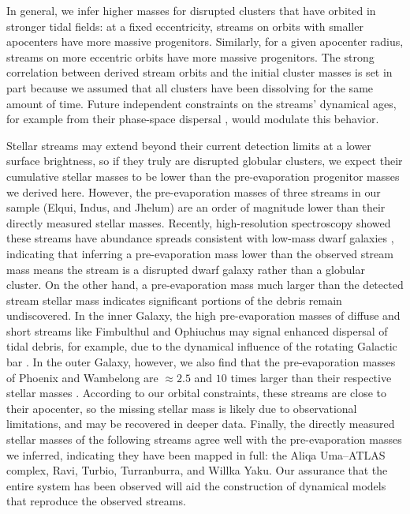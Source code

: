 \documentclass[twocolumn]{aastex63}
\begin{document}
In general, we infer higher masses for disrupted clusters that have orbited in stronger tidal fields: at a fixed eccentricity, streams on orbits with smaller apocenters have more massive progenitors.
Similarly, for a given apocenter radius, streams on more eccentric orbits have more massive progenitors.
The strong correlation between derived stream orbits and the initial cluster masses is set in part because we assumed that all clusters have been dissolving for the same amount of time.
Future independent constraints on the streams' dynamical ages, for example from their phase-space dispersal \citep{buckley:2019},  would modulate this behavior.

Stellar streams may extend beyond their current detection limits at a lower surface brightness, so if they truly are disrupted globular clusters, we expect their cumulative stellar masses to be lower than the pre-evaporation progenitor masses we derived here.
However, the pre-evaporation masses of three streams in our sample (Elqui, Indus, and Jhelum) are an order of magnitude lower than their directly measured stellar masses\citep{shipp:2018}.
Recently, high-resolution spectroscopy showed these streams have abundance spreads consistent with low-mass dwarf galaxies \citep{ji:2020}, indicating that inferring a pre-evaporation mass lower than the observed stream mass means the stream is a disrupted dwarf galaxy rather than a globular cluster.
On the other hand, a pre-evaporation mass much larger than the detected stream stellar mass indicates significant portions of the debris remain undiscovered.
In the inner Galaxy, the high pre-evaporation masses of diffuse and short streams like Fimbulthul and Ophiuchus may signal enhanced dispersal of tidal debris, for example, due to the dynamical influence of the rotating Galactic bar \citep{hattori:2016, price-whelan:2016}.
In the outer Galaxy, however, we also find that the pre-evaporation masses of Phoenix and Wambelong are $\approx2.5$ and $10$ times larger than their respective stellar masses \citep{shipp:2018}.
According to our orbital constraints, these streams are close to their apocenter, so the missing stellar mass is likely due to observational limitations, and may be recovered in deeper data.
Finally, the directly measured stellar masses of the following streams agree well with the pre-evaporation masses we inferred, indicating they have been mapped in full: the Aliqa Uma--ATLAS complex, Ravi, Turbio, Turranburra, and Willka Yaku.
Our assurance that the entire system has been observed will aid the construction of dynamical models that reproduce the observed streams.
\end{document}

